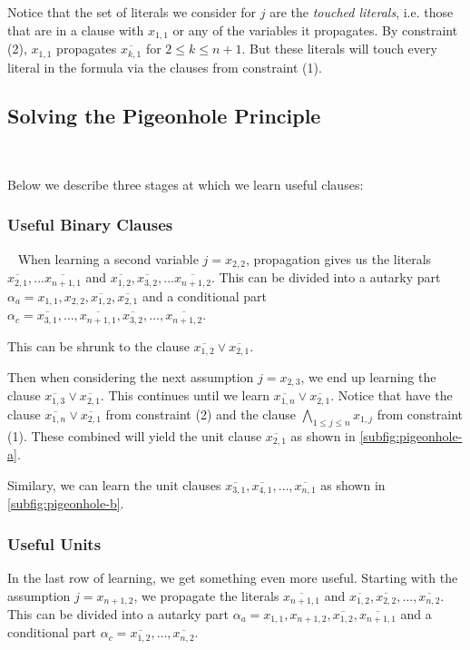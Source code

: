 Notice that the set of literals we consider for $j$ are the \emph{touched
literals}, i.e. those that are in a clause with $x_{1, 1}$ or any of the
variables it propagates. By constraint (2), $x_{1, 1}$ propagates
$\overline{x_{k, 1}}$ for $2 \leq k \leq n + 1$. But these literals will touch
every literal in the formula via the clauses from constraint (1). 


\subsection{Solving the Pigeonhole Principle}~\label{subsec:solvingpigeonhole}

Below we describe three stages at which we learn useful clauses:


\subsubsection{Useful Binary Clauses}~\label{subec:usefulbinaryclauses} When learning a second variable $j= x_{2, 2}$, propagation gives us the literals $\overline{x_{2, 1}}, ... \overline{x_{n+1, 1}}$ and $\overline{x_{1, 2}}, \overline{x_{3, 2}}, ... \overline{x_{n+1, 2}}$. This can be divided into a autarky part $\alpha_a = x_{1, 1}, x_{2, 2}, \overline{x_{1, 2}}, \overline{x_{2, 1}}$ and a conditional part $\alpha_c = \overline{x_{3, 1}}, \ldots, \overline{x_{n+1, 1}}, \overline{x_{3, 2}}, \ldots, \overline{x_{n+1, 2}}$.

This can be shrunk to the clause $\overline{x_{1, 2}} \lor \overline{x_{2, 1}}$.

Then when considering the next assumption $j = x_{2, 3}$, we end up learning the clause $\overline{x_{1, 3}} \lor \overline{x_{2, 1}}$. This continues until we learn $\overline{x_{1, n}} \lor \overline{x_{2, 1}}$. Notice that have the clause $\overline{x_{1, n}} \lor \overline{x_{2, 1}}$ from constraint (2) and the clause $\bigwedge_{1 \leq j \leq n} x_{1, j}$ from constraint (1). These combined will yield the unit clause $\overline{x_{2, 1}}$ as shown in \autoref{subfig:pigeonhole-a}.

Similary, we can learn the unit clauses $\overline{x_{3, 1}}, \overline{x_{4, 1}}, \ldots, \overline{x_{n, 1}}$ as shown in \autoref{subfig:pigeonhole-b}.


\subsubsection{Useful Units} In the last row of learning, we get something even more useful. Starting with the assumption $j = x_{n+1, 2}$, we propagate the literals $\overline{x_{n + 1, 1}}$ and $\overline{x_{1, 2}}, \overline{x_{2, 2}}, \ldots, \overline{x_{n, 2}}$.  This can be divided into a autarky part $\alpha_a = x_{1, 1}, x_{n+1, 2}, \overline{x_{1, 2}}, \overline{x_{n+1, 1}}$ and a conditional part $\alpha_c = \overline{x_{1, 2}}, \ldots, \overline{x_{n, 2}}$.

